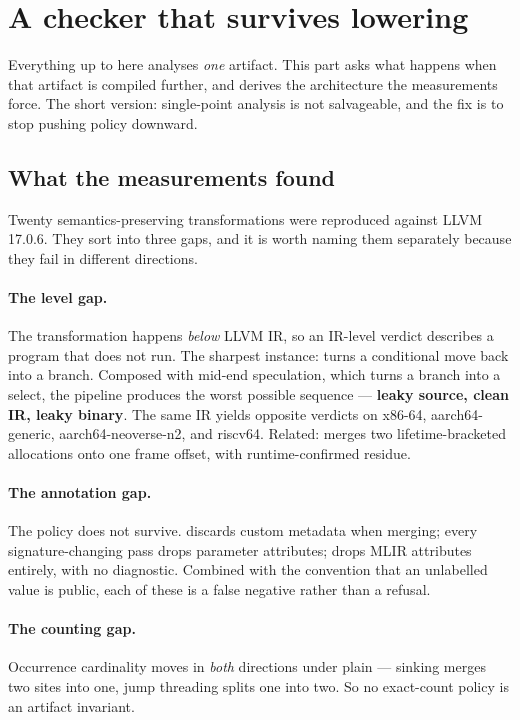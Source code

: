 \section{A checker that survives lowering}
\label{part:lowering}

Everything up to here analyses \emph{one} artifact. This part asks what happens
when that artifact is compiled further, and derives the architecture the
measurements force. The short version: single-point analysis is not salvageable,
and the fix is to stop pushing policy downward.

\subsection{What the measurements found}

Twenty semantics-preserving transformations were reproduced against LLVM 17.0.6.
They sort into three gaps, and it is worth naming them separately because they
fail in different directions.

\paragraph{The level gap.} The transformation happens \emph{below} LLVM IR, so an
IR-level verdict describes a program that does not run. The sharpest instance:
 turns a conditional move back into a branch. Composed
with mid-end speculation, which turns a branch into a select, the pipeline
produces the worst possible sequence --- \textbf{leaky source, clean 
IR, leaky binary}. The same IR yields opposite verdicts on x86-64,
aarch64-generic, aarch64-neoverse-n2, and riscv64. Related: 
merges two lifetime-bracketed allocations onto one frame offset, with
runtime-confirmed residue.

\paragraph{The annotation gap.} The policy does not survive. 
discards custom metadata when merging; every signature-changing pass drops
parameter attributes;  drops MLIR attributes entirely, with
no diagnostic. Combined with the convention that an unlabelled value is public,
each of these is a false negative rather than a refusal.

\paragraph{The counting gap.} Occurrence cardinality moves in \emph{both}
directions under plain  --- sinking merges two sites into one, jump
threading splits one into two. So no exact-count policy is an artifact
invariant.

